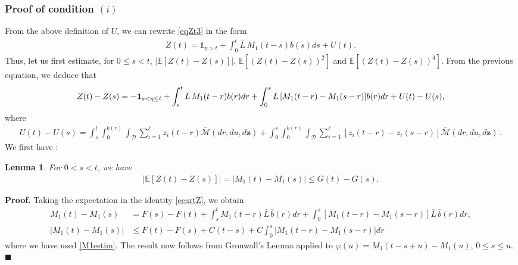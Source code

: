 \documentclass[11pt]{article}
\def\E{{\mathbb E}}
\def\D {\mathcal{D}}
\def\L {\bar{L}}
\def\z {\mathbf{z}}
\newtheorem{lemma}[theorem]{Lemma}
\newenvironment{proof}[1][Proof.]{\textbf{#1} }{\hfill $\blacksquare$}
\begin{document}
\subsubsection{Proof of condition $(i)$}
From the above definition of $U$, we can rewrite \eqref{eqZt3} in the form
\begin{align}\label{expressZ}
Z(t)= \mathds{1}_{\eta >t} +\int_0^t \L\,M_1(t-s) b(s) ds  + U(t).
\end{align}
 Thus, let us first estimate, for $0\le s<t$,  $|\E[Z(t)-Z(s)]|$, $\E[(Z(t)-Z(s))^2]$ and $\E[(Z(t)-Z(s))^4]$. From the previous equation, we deduce that 
 \begin{align}\label{ecartZ}
 Z(t)-Z(s)= -{\bf1}_{s<\eta\le t}+ \int_s^t \L\, M_1(t-r)b(r)dr+\int_0^s \L\,[M_1(t-r)-M_1(s-r)]b(r)dr + U(t)-U(s),
  \end{align}
  where 
 \begin{align}\label{ecartU}
U(t)-U(s)=\int_s^t\int_0^{b(r)}\int_\D \sum_{i=1}^\ell z_i(t-r)\bar{\mathcal{M}}(dr,du,d\z)
 +\int_0^s\int_0^{b(r)}\int_\D \sum_{i=1}^\ell [z_i(t-r)-z_i(s-r)]\bar{\mathcal{M}}(dr,du,d\z) \, .
 \end{align}
We first have : 
  \begin{lemma}\label{ecartEZ}
For $0< s<t$, we have
 \begin{align*}
 |\E[Z(t)-Z(s)]|= |M_1(t)-M_1(s)|\le G(t)-G(s).
 \end{align*}
 \end{lemma}
\begin{proof}
 Taking the expectation in the identity \eqref{ecartZ}, we obtain
 \begin{align*}
 M_1(t)-M_1(s)&= F(s)-F(t)+\int_s^tM_1(t-r)\L\,\bar{b}(r)dr+\int_0^s[M_1(t-r)-M_1(s-r)]\L\,\bar{b}(r)dr,\\
 |M_1(t)-M_1(s)|&\le F(t)-F(s)+C(t-s)+C\int_0^s|M_1(t-r)-M_1(s-r)|dr\,
 \end{align*}
where we have used \eqref{M1estim}. The result now follows from Gronwall's Lemma applied to $\varphi(u)=M_1(t-s+u)-M_1(u)$, $0\le s\le u$.
    \end{proof}
\end{document}
